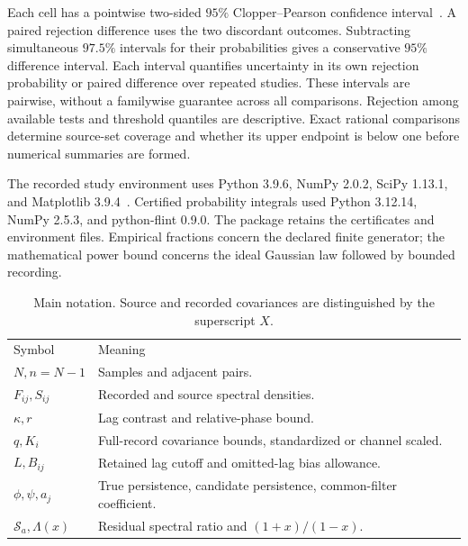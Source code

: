 Each cell has a pointwise two-sided $95\%$ Clopper--Pearson confidence interval~\cite{clopper}. A paired rejection difference uses the two discordant outcomes. Subtracting simultaneous $97.5\%$ intervals for their probabilities gives a conservative $95\%$ difference interval. Each interval quantifies uncertainty in its own rejection probability or paired difference over repeated studies. These intervals are pairwise, without a familywise guarantee across all comparisons. Rejection among available tests and threshold quantiles are descriptive. Exact rational comparisons determine source-set coverage and whether its upper endpoint is below one before numerical summaries are formed.

The recorded study environment uses Python 3.9.6, NumPy 2.0.2, SciPy 1.13.1, and Matplotlib 3.9.4~\cite{harris2020numpy,virtanen2020scipy,hunter2007matplotlib}. Certified probability integrals used Python 3.12.14, NumPy 2.5.3, and python-flint 0.9.0. The package retains the certificates and environment files. Empirical fractions concern the declared finite generator; the mathematical power bound concerns the ideal Gaussian law followed by bounded recording.

\begin{table}[t]
\caption{Main notation. Source and recorded covariances are distinguished by the superscript $X$.}\label{tab:notation}
\begin{ruledtabular}\begin{tabular}{p{}p{}}
Symbol & Meaning \\
$N,n=N-1$ & Samples and adjacent pairs. \\
$F_{ij},S_{ij}$ & Recorded and source spectral densities. \\
$\kappa,r$ & Lag contrast and relative-phase bound. \\
$q,K_i$ & Full-record covariance bounds, standardized or channel scaled. \\
$L,B_{ij}$ & Retained lag cutoff and omitted-lag bias allowance. \\
$\phi,\psi,a_j$ & True persistence, candidate persistence, common-filter coefficient. \\
$\mathcal S_a,\Lambda(x)$ & Residual spectral ratio and $(1+x)/(1-x)$. \\
\end{tabular}\end{ruledtabular}
\end{table}

